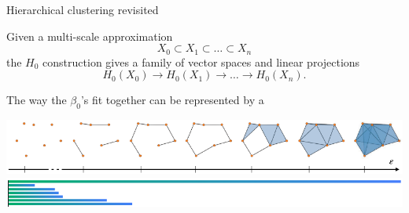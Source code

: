 \begin{frame}{Hierarchical clustering revisited}
	\pause

	Given a multi-scale approximation
	\[
	X_{0} \subset X_{1} \subset\dots\subset X_{n}
	\]
	the $H_0$ construction gives a family of vector spaces and linear projections\vspace*{-5pt}
	\[
	H_0(X_0) \to H_0(X_1) \to\dots\to H_0(X_n).
	\]

	\pause\medskip
	The way the $\beta_0$'s fit together can be represented by a 
	\pause\smallskip
	\begin{center}
		\includegraphics[scale=.7]{aux/vietoris-rips}
		\includegraphics[scale=.7]{aux/betti0}
	\end{center}
\end{frame}

